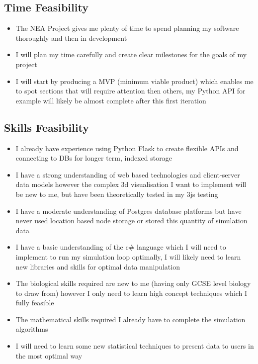 \subsection{Time Feasibility}
\begin{itemize}
    \item The NEA Project gives me plenty of time to spend planning my software thoroughly and then in development
    \item I will plan my time carefully and create clear milestones for the goals of my project
    \item I will start by producing a MVP (minimum viable product) which enables me to spot sections that will require attention then others, my Python API for example will likely be almost complete after this first iteration
\end{itemize}
\subsection{Skills Feasibility}
\begin{itemize}
    \item I already have experience using Python Flask to create flexible APIs and connecting to DBs for longer term, indexed storage
    \item I have a strong understanding of web based technologies and client-server data models however the complex 3d visualisation I want to implement will be new to me, but have been theoretically tested in my 3js testing
    \item I have a moderate understanding of Postgres database platforms but have never used location based node storage or stored this quantity of simulation data
    \item I have a basic understanding of the c\# language which I will need to implement to run my simulation loop optimally, I will likely need to learn new libraries and skills for optimal data manipulation
    \item The biological skills required are new to me (having only GCSE level biology to draw from) however I only need to learn high concept techniques which I fully feasible
    \item The mathematical skills required I already have to complete the simulation algorithms
    \item I will need to learn some new statistical techniques to present data to users in the most optimal way
\end{itemize}
